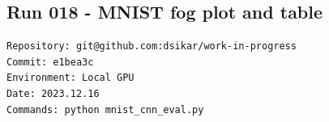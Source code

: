 


\subsection{Run 018 - MNIST fog plot and table}
\label{app_res:018}
\begin{verbatim}
Repository: git@github.com:dsikar/work-in-progress
Commit: e1bea3c
Environment: Local GPU
Date: 2023.12.16
Commands: python mnist_cnn_eval.py 
\end{verbatim}

